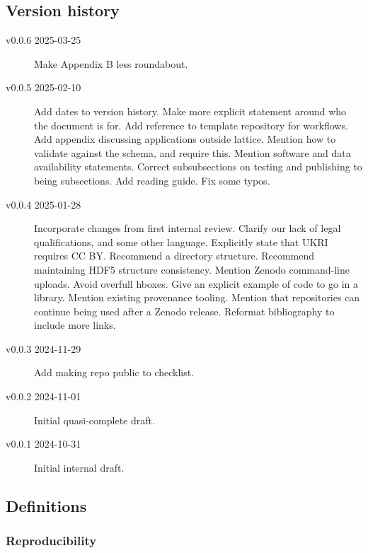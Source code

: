 \documentclass{article}
\begin{document}
\subsection{Version history}

\begin{description}
  \item[v0.0.6 2025-03-25]
        Make Appendix B less roundabout.
  \item[v0.0.5 2025-02-10]
        Add dates to version history.
        Make more explicit statement around who the document is for.
        Add reference to template repository for workflows.
        Add appendix discussing applications outside lattice.
        Mention how to validate against the schema,
        and require this.
        Mention software and data availability statements.
        Correct subsubsections on testing and publishing to being subsections.
        Add reading guide.
        Fix some typos.
  \item[v0.0.4 2025-01-28]
        Incorporate changes from first internal review.
        Clarify our lack of legal qualifications,
        and some other language.
        Explicitly state that UKRI requires CC BY\@.
        Recommend a directory structure.
        Recommend maintaining HDF5 structure consistency.
        Mention Zenodo command-line uploads.
        Avoid overfull hboxes.
        Give an explicit example of code to go in a library.
        Mention existing provenance tooling.
        Mention that repositories can continue being used after a Zenodo release.
        Reformat bibliography to include more links.
  \item[v0.0.3 2024-11-29]
        Add making repo public to checklist.
  \item[v0.0.2 2024-11-01]
        Initial quasi-complete draft.
  \item[v0.0.1 2024-10-31]
        Initial internal draft.
\end{description}

\subsection{Definitions}\label{sec:definitions}

\subsubsection{Reproducibility}\label{sec:reproducibility}
\end{document}
